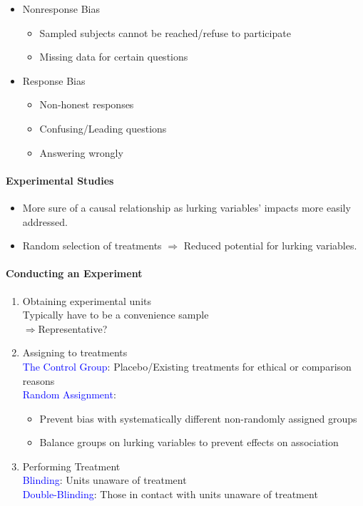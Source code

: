 \begin{itemize}
	\item Nonresponse Bias
		\begin{itemize}
			\item Sampled subjects cannot be reached/refuse to participate
			\item Missing data for certain questions
		\end{itemize}
	\item Response Bias
		\begin{itemize}
			\item Non-honest responses
			\item Confusing/Leading questions
			\item Answering wrongly
		\end{itemize}
\end{itemize}
\paragraph{Experimental Studies}
\begin{itemize}
	\item More sure of a causal relationship as lurking variables' impacts more easily addressed.
	\item Random selection of treatments $\Rightarrow$ Reduced potential for lurking variables.
\end{itemize}
\paragraph{Conducting an Experiment}
\begin{enumerate}
	\item Obtaining experimental units\\
		Typically have to be a convenience sample\\
		$\Rightarrow$\textcolor{Bittersweet}{Representative?}
	\item Assigning to treatments\\
		\textcolor{Blue}{The Control Group}: Placebo/Existing treatments for ethical or comparison reasons\\
		\textcolor{Blue}{Random Assignment}:
		\begin{itemize}
			\item Prevent bias with systematically different non-randomly assigned groups\\
			\item Balance groups on lurking variables to prevent effects on association
		\end{itemize}
	\item Performing Treatment\\
		\textcolor{Blue}{Blinding}: Units unaware of treatment\\
		\textcolor{Blue}{Double-Blinding}: Those in contact with units unaware of treatment
\end{enumerate}
